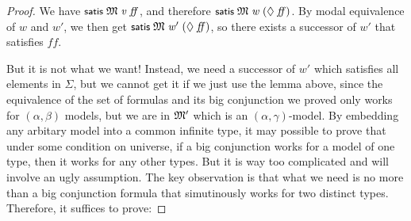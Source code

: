 \documentclass[letterpaper]{article}
\renewcommand{\HOLConst}[1]{{\textsf{\upshape\small #1}}}
\renewcommand{\HOLinline}[1]{\ensuremath{#1}}
\begin{document}
\begin{proof}
We have \HOLinline{\HOLConst{satis}\;\HOLFreeVar{\ensuremath{\mathfrak{M}}}\;\HOLFreeVar{v}\;\HOLFreeVar{ff}}, and therefore \HOLinline{\HOLConst{satis}\;\HOLFreeVar{\ensuremath{\mathfrak{M}}}\;\HOLFreeVar{w}\;(\HOLSymConst{\ensuremath{\Diamond}}\;\HOLFreeVar{ff})}. By modal equivalence of $w$ and $w'$, we then get \HOLinline{\HOLConst{satis}\;\HOLFreeVar{\ensuremath{\mathfrak{M}}}\;\HOLFreeVar{w\sp{\prime}}\;(\HOLSymConst{\ensuremath{\Diamond}}\;\HOLFreeVar{ff})}, so there exists a successor of $w'$ that satisfies $ff$. 

But it is not what we want! Instead, we need a successor of $w'$ which satisfies all elements in $\Sigma$, but we cannot get it if we just use the lemma above, since the equivalence of the set of formulas and its big conjunction we proved only works for $(\alpha,\beta)$ models, but we are in \HOLinline{\HOLFreeVar{\ensuremath{\mathfrak{M}'}}} which is an $(\alpha,\gamma)$-model. By embedding any arbitary model into a common infinite type, it may possible to prove that under some condition on universe, if a big conjunction works for a model of one type, then it works for any other types. But it is way too complicated and will involve an ugly assumption. The key observation is that what we need is no more than a big conjunction formula that simutinously works for two distinct types. Therefore, it suffices to prove:


\end{proof}
\end{document}

